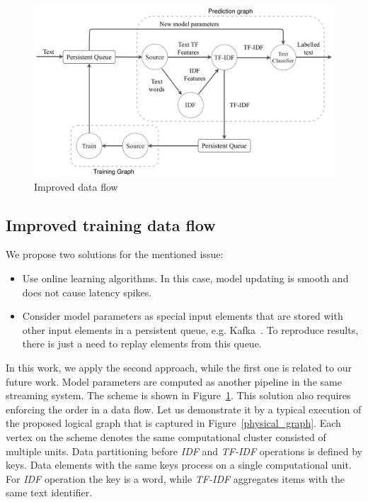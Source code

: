 \begin{figure}[htbp]
  \centering
  \includegraphics[scale=0.300]{pics/pipeline}
  \caption{Improved data flow}
  \label {pipeline}
\end{figure}

\subsection{Improved training data flow}

We propose two solutions for the mentioned issue:

\begin{itemize}
    \item Use online learning algorithms. In this case, model updating is smooth and does not cause latency spikes.
    \item Consider model parameters as special input elements that are stored with other input elements in a persistent queue, e.g. Kafka~\cite{kreps2011kafka}. To reproduce results, there is just a need to replay elements from this queue.
\end{itemize}

In this work, we apply the second approach, while the first one is related to our future work. Model parameters are computed as another pipeline in the same streaming system. The scheme is shown in Figure~\ref{pipeline}. This solution also requires enforcing the order in a data flow. Let us demonstrate it by a typical execution of the proposed logical graph that is captured in Figure~\ref{physical_graph}. Each vertex on the scheme denotes the same computational cluster consisted of multiple units. Data partitioning before {\em IDF} and {\em TF-IDF} operations is defined by keys. Data elements with the same keys process on a single computational unit. For {\em IDF} operation the key is a word, while {\em TF-IDF} aggregates items with the same text identifier. 

